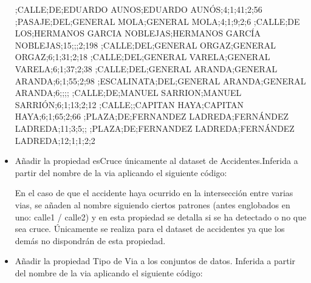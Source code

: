 \begin{itemize}
\begin{tiny}
;CALLE;DE;EDUARDO AUNOS;EDUARDO AUNÓS;4;1;41;2;56
;PASAJE;DEL;GENERAL MOLA;GENERAL MOLA;4;1;9;2;6
;CALLE;DE LOS;HERMANOS GARCIA NOBLEJAS;HERMANOS GARCÍA NOBLEJAS;15;;;2;198
;CALLE;DEL;GENERAL ORGAZ;GENERAL ORGAZ;6;1;31;2;18
;CALLE;DEL;GENERAL VARELA;GENERAL VARELA;6;1;37;2;38
;CALLE;DEL;GENERAL ARANDA;GENERAL ARANDA;6;1;55;2;98
;ESCALINATA;DEL;GENERAL ARANDA;GENERAL ARANDA;6;;;;
;CALLE;DE;MANUEL SARRION;MANUEL SARRIÓN;6;1;13;2;12
;CALLE;;CAPITAN HAYA;CAPITAN HAYA;6;1;65;2;66
;PLAZA;DE;FERNANDEZ LADREDA;FERNÁNDEZ LADREDA;11;3;5;;
;PLAZA;DE;FERNANDEZ LADREDA;FERNÁNDEZ LADREDA;12;1;1;2;2
\end{tiny}










   \item Añadir la propiedad esCruce únicamente al dataset de Accidentes.Inferida a partir del nombre de la via aplicando el siguiente código:
   
   

En el caso de que el accidente haya ocurrido en la intersección entre varias vias, se añaden al nombre siguiendo ciertos patrones (antes englobados en uno: calle1 / calle2) y en esta propiedad se detalla si se ha detectado o no que sea cruce.
\newline
Únicamente se realiza para el dataset de accidentes ya que los demás no dispondrán de esta propiedad.
\newline


    \item Añadir la propiedad Tipo de Via a los conjuntos de datos. Inferida a partir del nombre de la via aplicando el siguiente código:
    
       
      

\end{itemize}
